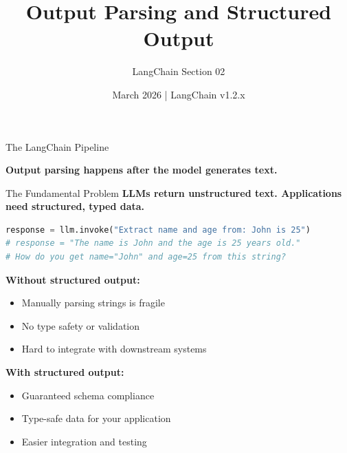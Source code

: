 \documentclass[aspectratio=169,11pt]{beamer}
\title{Output Parsing and Structured Output}
\subtitle{LangChain Section 02}
\date{March 2026 | LangChain v1.2.x}
\author{}
\begin{document}
\begin{frame}
\titlepage
\end{frame}

\begin{frame}[fragile]{The LangChain Pipeline}
\begin{center}
\end{center}

\textbf{Output parsing happens after the model generates text.}
\end{frame}

\begin{frame}[fragile]{The Fundamental Problem}
\textbf{LLMs return unstructured text. Applications need structured, typed data.}

\begin{lstlisting}[language=Python]
response = llm.invoke("Extract name and age from: John is 25")
# response = "The name is John and the age is 25 years old."
# How do you get name="John" and age=25 from this string?
\end{lstlisting}

\small
\textbf{Without structured output:}
\begin{itemize}
  \setlength{\itemsep}{1pt}
  \item Manually parsing strings is fragile
  \item No type safety or validation
  \item Hard to integrate with downstream systems
\end{itemize}

\textbf{With structured output:}
\begin{itemize}
  \setlength{\itemsep}{1pt}
  \item Guaranteed schema compliance
  \item Type-safe data for your application
  \item Easier integration and testing
\end{itemize}
\end{frame}
\end{document}
